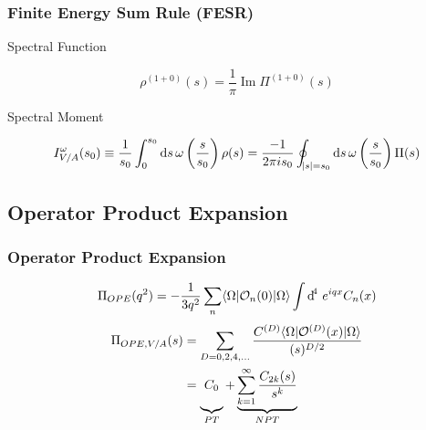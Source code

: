 \documentclass[fleqn]{beamer}
\DeclareMathOperator{\Ima}{Im}
\begin{document}
\begin{frame}
  \frametitle{Finite Energy Sum Rule (FESR)}
  Spectral Function
  \begin{ceqn}
    \begin{equation}
      \rho^{(1+0)}(s) = \frac{1}{\pi} \Ima \Pi^{(1+0)}(s)
    \end{equation}
  \end{ceqn}

  \vfill

  \begin{block}{Spectral Moment}
    \begin{ceqn}
      \begin{equation}
        I_{V/A}^{\omega}(s_0) \equiv \frac{1}{s_0} \int_{0}^{s_0} \dif s \, \omega\left(\frac{s}{s_0}\right) \rho(s) = \frac{-1}{2 \pi i s_0} \oint_{\abs{s}=s_0} \dif s \, \omega\left(\frac{s}{s_0} \right) \Pi(s)
      \end{equation}
    \end{ceqn}
  \end{block}
\end{frame}

\subsection{Operator Product Expansion}
\begin{frame}
  \frametitle{Operator Product Expansion}
  \begin{equation}
    \Pi_{OPE}(q^2) = -\frac{1}{3 q^2}\sum_n \langle\Omega\vert \mathcal{O}_n(0) \vert\Omega\rangle \int \dif^4\, e^{iqx} C_n(x)
  \end{equation}
  \begin{equation}
    \begin{split}
    \Pi_{OPE, V/A}(s) &= \sum_{D=0,2,4,\dots} \frac{C^{(D)} \langle\Omega\vert \mathcal{O}^{(D)}(x) \vert\Omega\rangle}{(s)^{D/2}} \\
    &= \underbrace{\vphantom{\sum_{k=1}^\infty} C_0}_{PT} + \underbrace{\sum_{k=1}^\infty \frac{C_{2k}(s)}{s^k}}_{NPT}
  \end{split}
\end{equation}
\end{frame}
\end{document}
